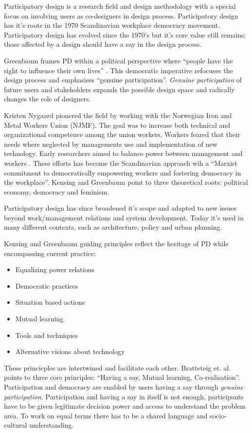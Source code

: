 \documentclass[UKenglish]{uiophd}
\begin{document}
		Participatory design is a research field and design methodology with a special focus on involving users as co-designers in design process. Participatory design has it's roots in the 1970 Scandinavian workplace democracy movement. Participatory design has evolved since the 1970's but it's core value still remains; those affected by a design should have a say in the design process\cite{Simonsen2012Routledge}.

		Greenbaum frames PD within a political perspective where ``people have the right to influence their own lives'' \cite[p.~39]{Hagen2010Social}. This democratic imperative refocuses the design process and emphasises ``genuine participation''\cite[p.~5]{Robertson2006Ethical}. 
		\textit{Genuine participation} of future users and stakeholders expands the possible design space and radically changes the role of designers. 

		Kristen Nygaard pionered the field by working with the Norwegian Iron and Metal Workers Union (NJMF). The goal was to increase both technical and organizational competence among the union workers. Workers feared that their needs where neglected by managements use and implementation of new technology. Early researchers aimed to balance power between management and workers \cite[p.~170]{Kensing1998Participatory}. These efforts has become the Scandinavian approach wih a ``Marxist commitment to democratically empowering workers and fostering democracy in the workplace''\cite[p.~164]{Spinuzzi2005Methodology}. Kensing and Greenbaum point to three theoretical roots: political economy, democracy and feminism\cite[p.~31]{Kensing2013Heritage}. 

		Participatory design has since broadened it's scope and adapted to new issues beyond work/management relations and system development. Today it's used in many different contexts, such as architecture, policy and urban planning\cite[p.~2]{Velden2014RePoliticising}. 

		Kensing and Greenbaum guiding principles reflect the heritage of PD while encompassing current practice:
		\begin{itemize}
		\item{Equalizing power relations}
		\item{Democratic practices}
		\item{Situation based actions}
		\item{Mutual learning}
		\item{Tools and techniques}
		\item{Alternative visions about technology}
		\end{itemize}\cite[p.~33-34]{Kensing2013Heritage}
		These princicples are intertwined and facilitate each other. Bratteteig et. al. points to three core principles: ``Having a say, Mutual learning, Co-realisation''. Participation and democracy are enabled by users having a say through \textit{genuine participation}. Participation and having a say in itself is not enough, participants have to be given legitimate decision power and access to understand the problem area. To work on equal terms there has to be a shared language and socio-cultural understanding\cite[p.152]{Loewgren2004Thoughtful}.  
\end{document}
